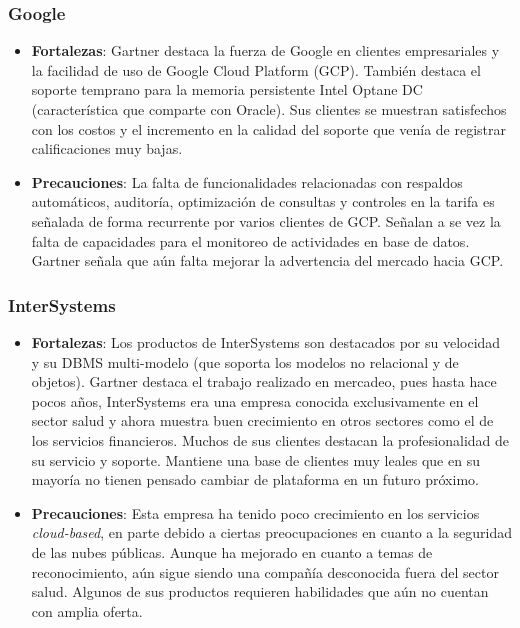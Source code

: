 \documentclass[11pt,letterpaper]{article}
\begin{document}
		\subsubsection{Google}
		\begin{itemize}
		\item {\bf Fortalezas}: Gartner destaca la fuerza de Google en clientes empresariales y la facilidad de uso de Google Cloud Platform (GCP). También destaca el soporte temprano para la memoria persistente Intel Optane DC (característica que comparte con Oracle). Sus clientes se muestran satisfechos con los costos y el incremento en la calidad del soporte que venía de registrar calificaciones muy bajas.
		\item {\bf Precauciones}: La falta de funcionalidades relacionadas con respaldos automáticos, auditoría, optimización de consultas y controles en la tarifa es señalada de forma recurrente por varios clientes de GCP. Señalan a se vez la falta de capacidades para el monitoreo de actividades en base de datos. Gartner señala que aún falta mejorar la advertencia del mercado hacia GCP.
		\end{itemize}
		\subsubsection{InterSystems}
		\begin{itemize}
		\item {\bf Fortalezas}: Los productos de InterSystems son destacados por su velocidad y su DBMS multi-modelo (que soporta los modelos no relacional y de objetos). Gartner destaca el trabajo realizado en mercadeo, pues hasta hace pocos años, InterSystems era una empresa conocida exclusivamente en el sector salud y ahora muestra buen crecimiento en otros sectores como el de los servicios financieros. Muchos de sus clientes destacan la profesionalidad de su servicio y soporte. Mantiene una base de clientes muy leales que en su mayoría no tienen pensado cambiar de plataforma en un futuro próximo.
		\item {\bf Precauciones}:
		Esta empresa ha tenido poco crecimiento en los servicios {\em cloud-based}, en parte debido a ciertas preocupaciones en cuanto a la seguridad de las nubes públicas. Aunque ha mejorado en cuanto a temas de reconocimiento, aún sigue siendo una compañía desconocida fuera del sector salud. Algunos de sus productos requieren habilidades que aún no cuentan con amplia oferta.
		\end{itemize}
\end{document}
